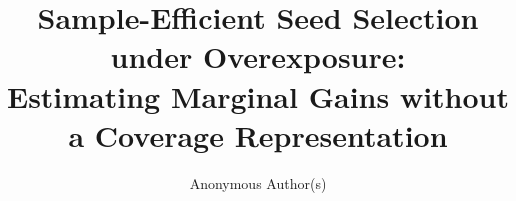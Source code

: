 \documentclass[runningheads]{llncs}
\begin{document}
\title{Sample-Efficient Seed Selection under Overexposure:\\
Estimating Marginal Gains without a Coverage Representation}


\author{Anonymous Author(s)}

\maketitle























\begingroup
\let\small\footnotesize


\endgroup
\end{document}
